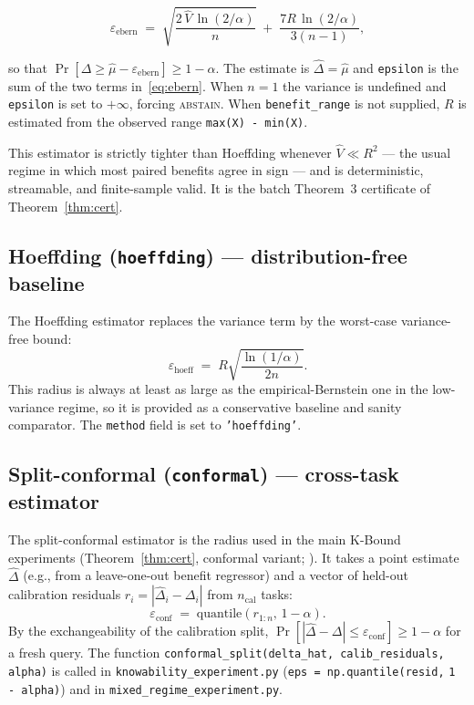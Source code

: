 \begin{equation}
  \varepsilon_{\mathrm{ebern}} \;=\;
  \sqrt{\frac{2\,\widehat{V}\,\ln(2/\alpha)}{n}}
  \;+\;
  \frac{7R\,\ln(2/\alpha)}{3(n-1)},
  \label{eq:ebern}
\end{equation}

so that $\Pr[\Delta \geq \widehat\mu - \varepsilon_{\mathrm{ebern}}] \geq 1 -
\alpha$.  The estimate is $\widehat\Delta = \widehat\mu$ and \texttt{epsilon} is
the sum of the two terms in~\eqref{eq:ebern}.  When $n = 1$ the variance is
undefined and \texttt{epsilon} is set to $+\infty$, forcing \textsc{abstain}.
When \texttt{benefit\_range} is not supplied, $R$ is estimated from the observed
range \texttt{max(X) - min(X)}.

This estimator is strictly tighter than Hoeffding whenever $\widehat{V} \ll R^2$
--- the usual regime in which most paired benefits agree in sign --- and is
deterministic, streamable, and finite-sample valid.  It is the batch Theorem~3
certificate of Theorem~\ref{thm:cert}.

\subsection{Hoeffding (\texttt{hoeffding}) --- distribution-free baseline}
\label{sec:kga-hoeffding}

The Hoeffding estimator replaces the variance term by the worst-case
variance-free bound:
\begin{equation}
  \varepsilon_{\mathrm{hoeff}} \;=\; R \sqrt{\frac{\ln(1/\alpha)}{2n}}.
  \label{eq:hoeff}
\end{equation}
This radius is always at least as large as the empirical-Bernstein one in the
low-variance regime, so it is provided as a conservative baseline and sanity
comparator.  The \texttt{method} field is set to \texttt{'hoeffding'}.

\subsection{Split-conformal (\texttt{conformal}) --- cross-task estimator}
\label{sec:kga-conformal}

The split-conformal estimator is the radius used in the main K-Bound experiments
(Theorem~\ref{thm:cert}, conformal variant; \cite{vovk2005algorithmic,
angelopoulos2023conformal}).  It takes a point estimate $\widehat\Delta$ (e.g.,
from a leave-one-out benefit regressor) and a vector of held-out calibration
residuals $r_i = |\widehat\Delta_i - \Delta_i|$ from $n_\mathrm{cal}$ tasks:
\begin{equation}
  \varepsilon_{\mathrm{conf}} \;=\; \mathrm{quantile}\!\left(r_{1:n},\, 1 -
  \alpha\right).
  \label{eq:conformal}
\end{equation}
By the exchangeability of the calibration split, $\Pr[|\widehat\Delta -
\Delta| \leq \varepsilon_{\mathrm{conf}}] \geq 1 - \alpha$ for a fresh query.
The function \texttt{conformal\_split(delta\_hat, calib\_residuals, alpha)} is
called in \texttt{knowability\_experiment.py} (\texttt{eps = np.quantile(resid,}
\texttt{1 - alpha)}) and in \texttt{mixed\_regime\_experiment.py}.

